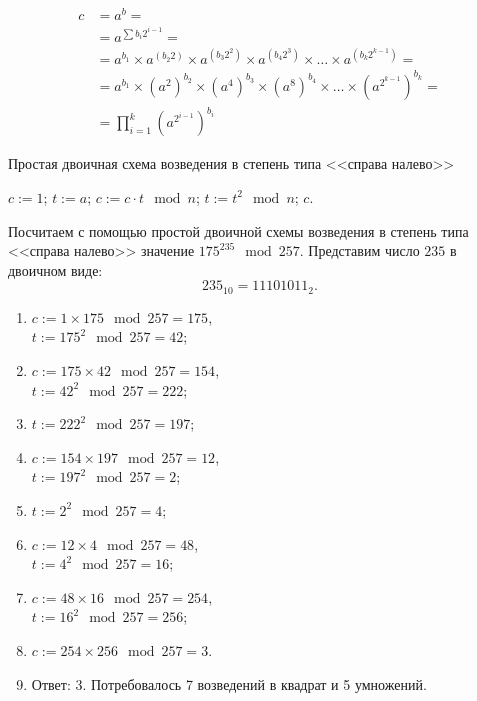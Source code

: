 \[\begin{array}{ll}
c & = a^b = \\
  & = a^{\sum b_i 2^{i-1}} = \\
  & = a^{b_1} \times a^{(b_2 2)} \times a^{(b_3 2^2)} \times a^{(b_4 2^3)} \times \dots \times a^{(b_k 2^{k-1})} = \\
  & = a^{b_1} \times \left(a^2\right)^{b_2} \times \left(a^4\right)^{b_3} \times \left(a^8\right)^{b_4} \times \dots \times \left(a^{2^{k-1}}\right)^{b_k} = \\
  & = \prod\limits_{i=1}^{k} \left(a^{2^{i-1}}\right)^{b_i}
\end{array}\]

\begin{algorithm}[ht]
	\caption{Простая двоичная схема возведения в степень типа <<справа налево>>\label{alg:power-mod-right-to-left}}
	\begin{algorithmic}
		\STATE $c := 1$;
		\STATE $t := a$;
				\STATE $c := c \cdot t \mod n$;
			\ENDIF
			\STATE $t := t^2 \mod n$;
		\ENDFOR
		\RETURN $c$.
	\end{algorithmic}
\end{algorithm}

\example Посчитаем с помощью простой двоичной схемы возведения в степень типа <<справа налево>> значение $175^{235} \mod 257$. Представим число $235$ в двоичном виде:
\[ 235_{10} = 11101011_{2}.\]
\begin{enumerate}
	\item $ c := 1 \times 175 \mod 257 = 175$, \\
		$ t:= 175^2 \mod 257 = 42$;
	\item $ c := 175 \times 42 \mod 257 = 154$, \\
		$ t:= 42^2 \mod 257 = 222$;
	\item $ t:= 222^2 \mod 257 = 197$;
	\item $ c := 154 \times 197 \mod 257 = 12$, \\
		$ t:= 197^2 \mod 257 = 2$;
	\item $ t:= 2^2 \mod 257 = 4$;
	\item $ c := 12 \times 4 \mod 257 = 48$, \\
		$ t:= 4^2 \mod 257 = 16$;
	\item $ c := 48 \times 16 \mod 257 = 254$, \\
		$ t:= 16^2 \mod 257 = 256$;
	\item $ c := 254 \times 256 \mod 257 = 3$.
	\item Ответ: 3. Потребовалось 7 возведений в квадрат и 5 умножений.
\end{enumerate}
\exampleend




